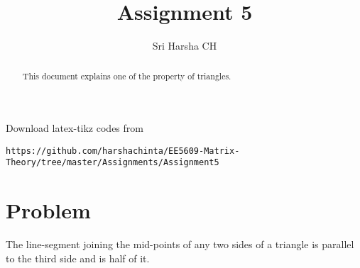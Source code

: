 \documentclass[journal,12pt,twocolumn]{IEEEtran}
\begin{document}
\renewcommand{\thefigure}{\theproblem}

\def\putbox#1#2#3{\makebox[0in][l]{\makebox[#1][l]{}\raisebox{\baselineskip}[0in][0in]{\raisebox{#2}[0in][0in]{#3}}}}
     \def\rightbox#1{\makebox[0in][r]{#1}}
     \def\centbox#1{\makebox[0in]{#1}}
     \def\topbox#1{\raisebox{-\baselineskip}[0in][0in]{#1}}
     \def\midbox#1{\raisebox{-0.5\baselineskip}[0in][0in]{#1}}
\vspace{3cm}
\title{Assignment 5}
\author{Sri Harsha CH}

\maketitle
\newpage

\bigskip
\renewcommand{\thefigure}{\theenumi}
\renewcommand{\thetable}{\theenumi}

\begin{abstract}
This document explains one of the property of triangles.
\end{abstract}
Download latex-tikz codes from 
%
\begin{lstlisting}
https://github.com/harshachinta/EE5609-Matrix-Theory/tree/master/Assignments/Assignment5
\end{lstlisting}
%
\section{Problem}
The line-segment joining the mid-points of any two sides of a triangle is parallel to the third side and is half of it.
\end{document}
